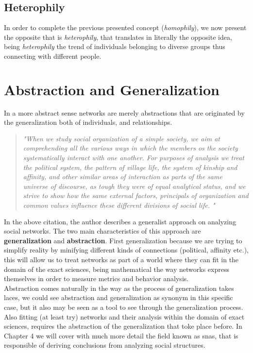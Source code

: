 \subsection*{Heterophily}

In order to complete the previous presented concept (\textit{homophily}), we now present the opposite that is \textit{heterophily}, that translates in literally the opposite idea, being \textit{heterophily} the trend of individuals belonging to diverse groups thus connecting with different people.


\section{Abstraction and Generalization}

In a more abstract sense networks are merely abstractions that are originated by the generalization both of individuals, and relationships.\\

\begin{quote}
\textit{"When we study social organization of a simple society, we aim at comprehending all the various ways in which the members os the society systematically interact with one another. For purposes of analysis we treat the political system, the pattern of village life, the system of kinship and affinity, and other similar areas of interaction as parts of the same universe of discourse, as tough they were of equal analytical status, and we strive to show how the same external factors, principals of organization and common values influence these different divisions of social life.
"}
\citep{barnes1954class}
\end{quote}

\indent In the above citation, the author describes a generalist approach on analyzing social networks. The two main characteristics of this approach are \textbf{generalization} and \textbf{abstraction}. First generalization because we are trying to simplify reality by minifying different kinds of connections (political, affinity etc.), this will allow us to treat networks as part of a world where they can fit in the domain of the exact sciences, being mathematical the way networks express themselves in order to measure metrics and behavior analysis.\\
\indent Abstraction comes naturally in the way as the process of generalization takes laces, we could see abstraction and generalization as synonym in this specific case, but it also may be seen as a tool to see through the generalization process. Also fitting (at least try) networks and their analysis within the domain of exact sciences, requires the abstraction of the generalization that toke place before. In Chapter 4 we will cover with much more detail the field known as \glspl{sna}, that is responsible of deriving conclusions from analyzing social structures.

